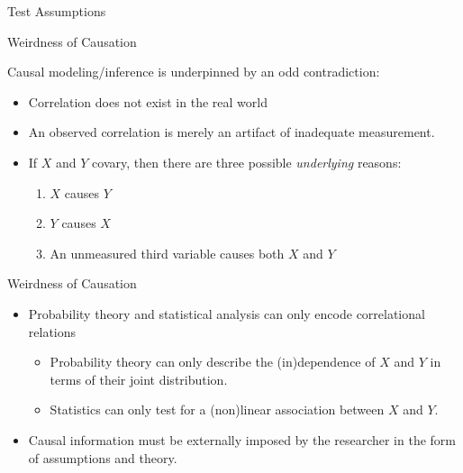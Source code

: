 \documentclass{beamer}
\newcommand{\va}[0]{\vspace{12pt}}
\newcommand{\vb}[0]{\vspace{6pt}}
\newcommand{\vc}[0]{\vspace{3pt}}
\begin{document}
\begin{frame}[allowframebreaks]{Test Assumptions}
  


\end{frame}



\begin{frame}{Weirdness of Causation}

  Causal modeling/inference is underpinned by an odd contradiction:
  \va
  \begin{itemize}
  \item Correlation does not exist in the real world
    \va
  \item An observed correlation is merely an artifact of inadequate
    measurement.
    \vb
  \item If $X$ and $Y$ covary, then there are three possible
    \emph{underlying} reasons:
    \vb
    \begin{enumerate}
    \item $X$ causes $Y$
      \vc
    \item $Y$ causes $X$
      \vc
    \item An unmeasured third variable causes both $X$ and $Y$
    \end{enumerate}
  \end{itemize}
  
\end{frame}



\begin{frame}{Weirdness of Causation}
  
  \begin{itemize}
  \item Probability theory and statistical analysis can only encode
    correlational relations
    \va
    \begin{itemize}
    \item Probability theory can only describe the (in)dependence of $X$
      and $Y$ in terms of their joint distribution.
      \vb
    \item Statistics can only test for a (non)linear association between
      $X$ and $Y$.
    \end{itemize}
    \va
  \item Causal information must be externally imposed by the researcher
    in the form of assumptions and theory.
  \end{itemize}
  
\end{frame}
\end{document}
